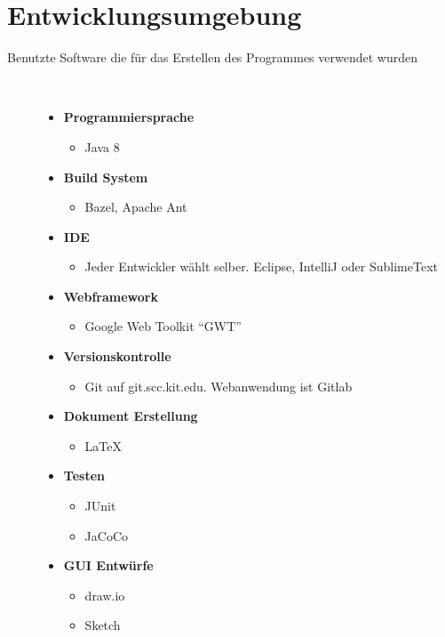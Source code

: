 \documentclass[parskip=full,11pt,twoside]{scrartcl}
\begin{document}
\section{Entwicklungsumgebung}
  \begin{description}
	\item[Benutzte Software die für das Erstellen des Programmes verwendet wurden]~\par
	\begin{itemize}
		\item \textbf{Programmiersprache}
		\begin{itemize}
			\item Java 8
		\end{itemize}
		\item \textbf{Build System}
		\begin{itemize}
			\item Bazel, Apache Ant
		\end{itemize}
		\item \textbf{IDE}
		\begin{itemize}
			\item Jeder Entwickler wählt selber. Eclipse, IntelliJ oder SublimeText
		\end{itemize}
		\item \textbf{Webframework}
		\begin{itemize}
			\item Google Web Toolkit \enquote{GWT}
		\end{itemize}
		\item \textbf{Versionskontrolle}
		\begin{itemize}
			\item Git auf git.scc.kit.edu. Webanwendung ist Gitlab
		\end{itemize}
		\item \textbf{Dokument Erstellung}
		\begin{itemize}
			\item LaTeX
		\end{itemize}
		\item \textbf{Testen}
		\begin{itemize}
			\item JUnit
			\item JaCoCo
		\end{itemize}
		\item \textbf{GUI Entwürfe}
			\begin{itemize}
				\item draw.io
				\item Sketch
			\end{itemize}

\end{itemize}
\end{description}
\end{document}

